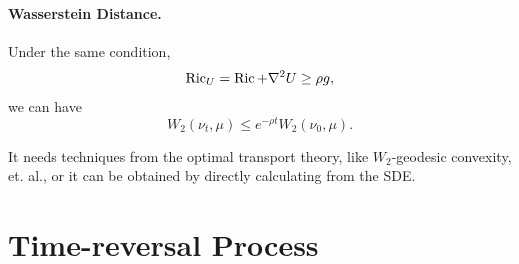\paragraph{Wasserstein Distance.} Under the same condition,
\begin{equation*}
    \operatorname{Ric}_U = \operatorname{Ric} + \nabla^2 U \geq \rho g,
\end{equation*}
we can have
\begin{equation*}
    W_2(\nu_t,\mu) \leq e^{-\rho t}W_2(\nu_0,\mu).
\end{equation*}
\begin{rmk}
    It needs techniques from the optimal transport theory, like $W_2$-geodesic convexity, et. al., or it can be obtained by directly calculating from the SDE.
\end{rmk}

\section{Time-reversal Process}

